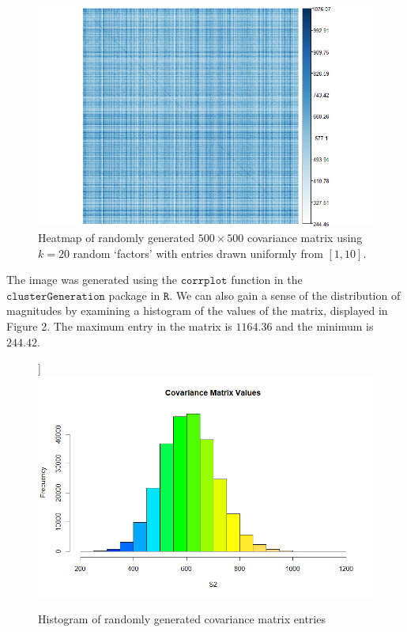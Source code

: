 \documentclass[]{scrartcl}
\newcommand{\1}[1]{\mathbbm{1}_{\left\{#1\right\}}}
\begin{document}
\begin{figure}[h]
	\centering
	\includegraphics[width=\textwidth]{CovMat1}
	\caption{Heatmap of randomly generated $500 \times 500$ covariance matrix using $k = 20$ random `factors' with entries drawn uniformly from $[1, 10]$.}
\end{figure} 
The image was generated using the $\texttt{corrplot}$ function in the $\texttt{clusterGeneration}$ package in $\texttt{R}$. We can also gain a sense of the distribution of magnitudes by examining a histogram of the values of the matrix, displayed in Figure 2. The maximum entry in the matrix is $1164.36$ and the minimum is $244.42$.

\begin{figure}[h] ]\label{fig:hist}
	\centering
	\includegraphics[width=\textwidth]{CovHist}
	\caption{Histogram of randomly generated covariance matrix entries}
\end{figure} 
\end{document}
